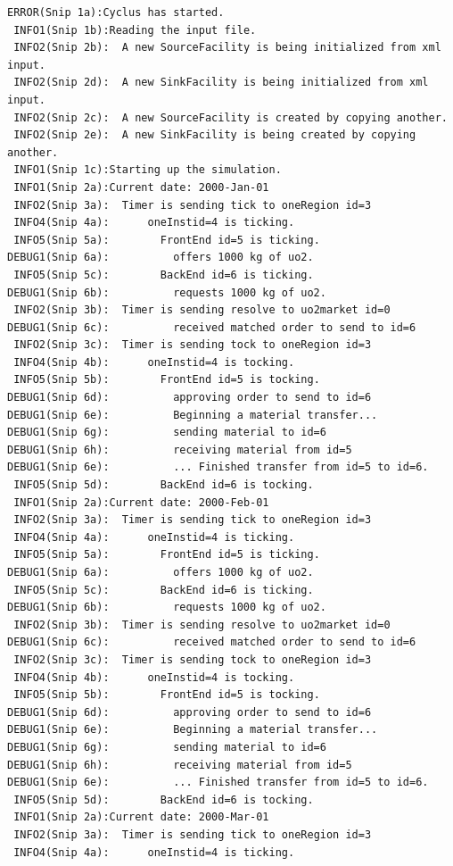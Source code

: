 \documentclass[letterpaper,10pt,english]{sphinxmanual}
\begin{document}
\begin{Verbatim}[commandchars=\\\{\}]
 ERROR(Snip 1a):Cyclus has started.
 INFO1(Snip 1b):Reading the input file.
 INFO2(Snip 2b):  A new SourceFacility is being initialized from xml input.
 INFO2(Snip 2d):  A new SinkFacility is being initialized from xml input.
 INFO2(Snip 2c):  A new SourceFacility is created by copying another.
 INFO2(Snip 2e):  A new SinkFacility is being created by copying another.
 INFO1(Snip 1c):Starting up the simulation.
 INFO1(Snip 2a):Current date: 2000-Jan-01
 INFO2(Snip 3a):  Timer is sending tick to oneRegion id=3
 INFO4(Snip 4a):      oneInstid=4 is ticking.
 INFO5(Snip 5a):        FrontEnd id=5 is ticking.
DEBUG1(Snip 6a):          offers 1000 kg of uo2.
 INFO5(Snip 5c):        BackEnd id=6 is ticking.
DEBUG1(Snip 6b):          requests 1000 kg of uo2.
 INFO2(Snip 3b):  Timer is sending resolve to uo2market id=0
DEBUG1(Snip 6c):          received matched order to send to id=6
 INFO2(Snip 3c):  Timer is sending tock to oneRegion id=3
 INFO4(Snip 4b):      oneInstid=4 is tocking.
 INFO5(Snip 5b):        FrontEnd id=5 is tocking.
DEBUG1(Snip 6d):          approving order to send to id=6
DEBUG1(Snip 6e):          Beginning a material transfer...
DEBUG1(Snip 6g):          sending material to id=6
DEBUG1(Snip 6h):          receiving material from id=5
DEBUG1(Snip 6e):          ... Finished transfer from id=5 to id=6.
 INFO5(Snip 5d):        BackEnd id=6 is tocking.
 INFO1(Snip 2a):Current date: 2000-Feb-01
 INFO2(Snip 3a):  Timer is sending tick to oneRegion id=3
 INFO4(Snip 4a):      oneInstid=4 is ticking.
 INFO5(Snip 5a):        FrontEnd id=5 is ticking.
DEBUG1(Snip 6a):          offers 1000 kg of uo2.
 INFO5(Snip 5c):        BackEnd id=6 is ticking.
DEBUG1(Snip 6b):          requests 1000 kg of uo2.
 INFO2(Snip 3b):  Timer is sending resolve to uo2market id=0
DEBUG1(Snip 6c):          received matched order to send to id=6
 INFO2(Snip 3c):  Timer is sending tock to oneRegion id=3
 INFO4(Snip 4b):      oneInstid=4 is tocking.
 INFO5(Snip 5b):        FrontEnd id=5 is tocking.
DEBUG1(Snip 6d):          approving order to send to id=6
DEBUG1(Snip 6e):          Beginning a material transfer...
DEBUG1(Snip 6g):          sending material to id=6
DEBUG1(Snip 6h):          receiving material from id=5
DEBUG1(Snip 6e):          ... Finished transfer from id=5 to id=6.
 INFO5(Snip 5d):        BackEnd id=6 is tocking.
 INFO1(Snip 2a):Current date: 2000-Mar-01
 INFO2(Snip 3a):  Timer is sending tick to oneRegion id=3
 INFO4(Snip 4a):      oneInstid=4 is ticking.

\end{Verbatim}
\end{document}
